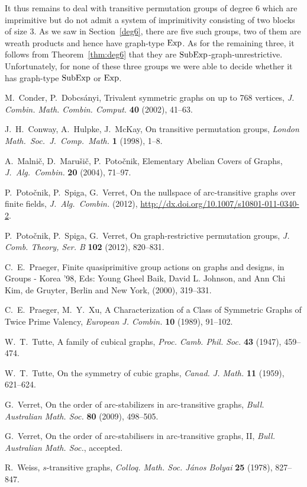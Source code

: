 \documentclass{amsart}
\theoremstyle{definition}
\begin{document}
It thus remains to deal with transitive permutation groups of degree $6$ which are imprimitive but do not admit a system of imprimitivity consisting of two blocks of size $3$. As we saw in Section~\ref{deg6}, there are five such groups, two of them are wreath products and hence have graph-type ${\mathop{\rm Exp}}$. As for the remaining three, it follows from Theorem~\ref{thm:deg6} that they are ${\mathop{\rm SubExp}}$-graph-unrestrictive. Unfortunately, for none of these three groups we were able to decide whether it has graph-type ${\mathop{\rm SubExp}}$ or ${\mathop{\rm Exp}}$.


 M.~Conder, P.~Dobcs\'{a}nyi, Trivalent symmetric graphs on up to 768 vertices, \textit{J. Combin. Math. Combin. Comput.} \textbf{40} (2002), 41--63. 

 J.~H.~Conway, A.~Hulpke, J.\ McKay, On transitive permutation groups, \textit{London Math.\  Soc.\ J.\ Comp.\ Math.} {\bf 1} (1998), 1--8.

 A.~Malni\v{c}, D.~Maru\v{s}i\v{c}, P.~Poto\v{c}nik, Elementary Abelian Covers of Graphs, \textit{J.\ Alg.\ Combin.} {\bf 20} (2004), 71--97.

 P.~Poto\v{c}nik, P.~Spiga, G.~Verret,  On the nullspace of arc-transitive graphs over finite fields,
  \textit{J.\ Alg.\ Combin.} (2012), \url{http://dx.doi.org/10.1007/s10801-011-0340-2}.

 P.~Poto\v{c}nik, P.~Spiga, G.~Verret, On graph-restrictive permutation groups, \textit{J. Comb. Theory, Ser. B} \textbf{102} (2012), 820--831.

 C.~E.~Praeger, Finite quasiprimitive group actions on graphs and designs, in Groups - Korea '98, Eds: Young Gheel Baik, David
  L. Johnson, and Ann Chi Kim, de Gruyter, Berlin and New York, (2000), 319--331. 

 C.~E.~Praeger, M.~Y.~Xu, A Characterization of a Class of Symmetric Graphs of Twice Prime Valency, \textit{European J. Combin.} \textbf{10} (1989), 91--102.

 W.~T.~Tutte, A family of cubical graphs, \textit{Proc. Camb. Phil. Soc.} \textbf{43} (1947), 459--474.

 W.~T.~Tutte, On the symmetry of cubic graphs, \textit{Canad. J. Math.} \textbf{11} (1959), 621--624.

 G.~Verret, On the order of arc-stabilizers in arc-transitive graphs, \textit{Bull. Australian Math. Soc.} \textbf{80}  (2009), 498--505.

 G.~Verret, On the order of arc-stabilisers in arc-transitive graphs, II, \textit{Bull. Australian Math. Soc.}, accepted.

 R.~Weiss, $s$-transitive graphs, \textit{Colloq. Math. Soc. J\'{a}nos Bolyai} \textbf{25} (1978), 827--847.
\end{document}
